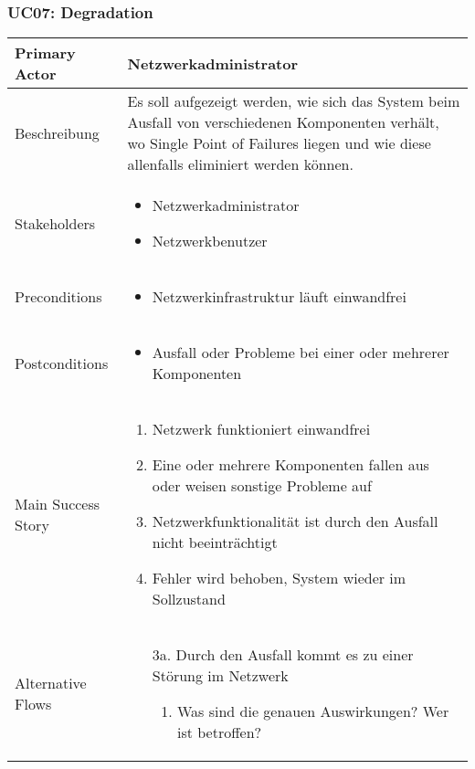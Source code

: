 \subsubsection{UC07: Degradation}
\begin{table}[H]
	\centering
	\begin{tabularx}{\textwidth}{l | X}
		Primary Actor   & Netzwerkadministrator       \\
		\hline
		Beschreibung   & Es soll aufgezeigt werden, wie sich das System beim Ausfall von verschiedenen Komponenten verhält, wo Single Point of Failures liegen und wie diese allenfalls eliminiert werden können.  \\ 
		\hline
		Stakeholders       & 
		\begin{itemize}
			\item Netzwerkadministrator
			\item Netzwerkbenutzer
		\end{itemize} \\ 
		Preconditions      &
		\begin{itemize}	
			\item Netzwerkinfrastruktur läuft einwandfrei
		\end{itemize}  \\
		\hline
		Postconditions     & 
		\begin{itemize}	
			\item Ausfall oder Probleme bei einer oder mehrerer Komponenten
		\end{itemize}  \\
		\hline
		Main Success Story & 
		\begin{enumerate}
			\item Netzwerk funktioniert einwandfrei
			\item Eine oder mehrere Komponenten fallen aus oder weisen sonstige Probleme auf
			\item Netzwerkfunktionalität ist durch den Ausfall nicht beeinträchtigt
			\item Fehler wird behoben, System wieder im Sollzustand
		\end{enumerate}
		\\
		\hline
		Alternative Flows  & 
		\begin{itemize}
			\item[3a.]  Durch den Ausfall kommt es zu einer Störung im Netzwerk
			\begin{enumerate}
				\item Was sind die genauen Auswirkungen? Wer ist betroffen?

\end{enumerate}
\end{itemize}
\end{tabularx}
\end{table}
